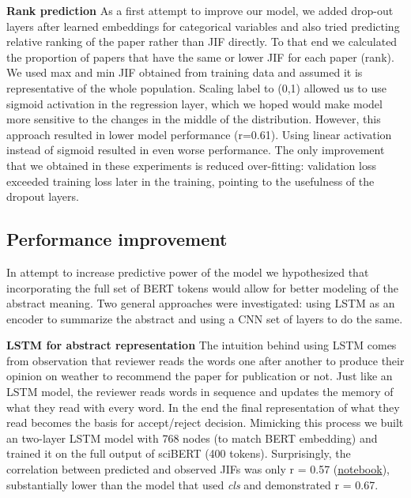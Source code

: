 \documentclass[11pt]{article}
\begin{document}
\textbf{Rank prediction} As a first attempt to improve our model, we added drop-out layers after learned embeddings for categorical variables and also tried predicting relative ranking of the paper rather than JIF directly. To that end we calculated the proportion of papers that have the same or lower JIF for each paper (rank). We used max and min JIF obtained from training data and assumed it is representative of the whole population. Scaling label to (0,1) allowed us to use sigmoid activation in the regression layer, which we hoped would make model more sensitive to the changes in the middle of the distribution. However, this approach resulted in lower model performance (r=0.61). Using linear activation instead of sigmoid resulted in even worse performance. The only improvement that we obtained in these experiments is reduced over-fitting: validation loss exceeded training loss later in the training, pointing to the usefulness of the dropout layers.

\subsection{Performance improvement}
In attempt to increase predictive power of the model we hypothesized that incorporating the full set of BERT tokens would allow for better modeling of the abstract meaning. Two general approaches were investigated: using LSTM as an encoder to summarize the abstract and using a CNN set of layers to do the same.

\textbf{LSTM for abstract representation} The intuition behind using LSTM comes from observation that reviewer reads the words one after another to produce their opinion on weather to recommend the paper for publication or not. Just like an LSTM model, the reviewer reads words in sequence and updates the memory of what they read with every word. In the end the final representation of what they read becomes the basis for accept/reject decision. Mimicking this process we built an two-layer LSTM model with 768 nodes (to match BERT embedding) and trained it on the full output of sciBERT (400 tokens). Surprisingly, the correlation between predicted and observed JIFs was only r = 0.57 (\href{https://github.com/ArtemChemist/w266_project/blob/main/Notebooks/sciBERT%20w%20meta%20to%20LSTM.ipynb}{notebook}), substantially lower than the model that used \textit{cls} and demonstrated r = 0.67.
\end{document}
